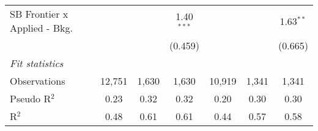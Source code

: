 \begin{tabular}{lcccccc}
   SB Frontier x Applied - Bkg.   &             &             & 1.40$^{***}$  &              &               & 1.63$^{**}$\\   
                                  &             &             & (0.459)       &              &               & (0.665)\\   
   \midrule
   \emph{Fit statistics}\\
   Observations                   & 12,751      & 1,630       & 1,630         & 10,919       & 1,341         & 1,341\\  
   Pseudo R$^2$                   & 0.23        & 0.32        & 0.32          & 0.20         & 0.30          & 0.30\\  
   R$^2$                          & 0.48        & 0.61        & 0.61          & 0.44         & 0.57          & 0.58\\  
   

\end{tabular}
